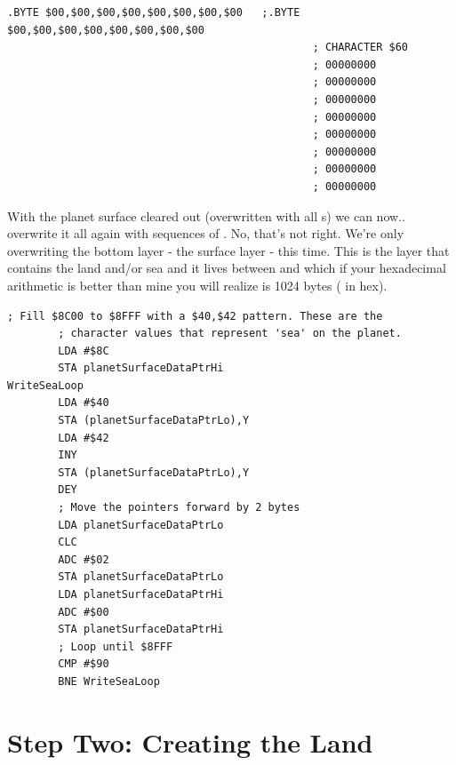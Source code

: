 \begin{lstlisting}[caption=The empty character bit map (all zeroes) used to overwrite the surface before populating it.,basicstyle=\tiny]
        .BYTE $00,$00,$00,$00,$00,$00,$00,$00   ;.BYTE $00,$00,$00,$00,$00,$00,$00,$00
                                                ; CHARACTER $60
                                                ; 00000000           
                                                ; 00000000           
                                                ; 00000000           
                                                ; 00000000           
                                                ; 00000000           
                                                ; 00000000           
                                                ; 00000000           
                                                ; 00000000           
\end{lstlisting}

With the planet surface cleared out (overwritten with all s) we can now.. overwrite it all again with sequences of
. No, that's not right. We're only overwriting the bottom layer - the surface layer - this time. This is the
layer that contains the land and/or sea and it lives between  and  which if your hexadecimal
arithmetic is better than mine you will realize is 1024 bytes ( in hex).

\begin{lstlisting}[caption=Filling the entire bottom surface of the planet with \icode{\$40,\$42}\, which gives us the sea. Our next step is
to overwrite some of this with land.]
        ; Fill $8C00 to $8FFF with a $40,$42 pattern. These are the
        ; character values that represent 'sea' on the planet.
        LDA #$8C
        STA planetSurfaceDataPtrHi
WriteSeaLoop   
        LDA #$40
        STA (planetSurfaceDataPtrLo),Y
        LDA #$42
        INY
        STA (planetSurfaceDataPtrLo),Y
        DEY
        ; Move the pointers forward by 2 bytes
        LDA planetSurfaceDataPtrLo
        CLC
        ADC #$02
        STA planetSurfaceDataPtrLo
        LDA planetSurfaceDataPtrHi
        ADC #$00
        STA planetSurfaceDataPtrHi
        ; Loop until $8FFF
        CMP #$90
        BNE WriteSeaLoop
\end{lstlisting}



\section{Step Two: Creating the Land}

